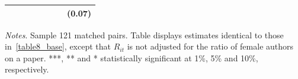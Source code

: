 \begin{table}[H]
\begin{threeparttable}
\begin{tabular}{p{3cm}S[table-format=3.3]@{}S[table-format=3.3]@{}S[table-format=3.2]@{}S[table-format=4.3]@{}S[table-format=3.3]@{}S[table-format=3.1]@{}S@{}}
                                          &            &            &            &            &            &            &      {(0.07)}   \\
            \bottomrule
        \end{tabular}
        \begin{tablenotes}
            \tiny
            \item \textit{Notes}. Sample 121 matched pairs. Table displays estimates identical to those in~\autoref{table8_base}, except that \(R_{it}\) is not adjusted for the ratio of female authors on a paper. ***, ** and * statistically significant at 1\%, 5\% and 10\%, respectively.
        \end{tablenotes}
    \end{threeparttable}
\end{table}